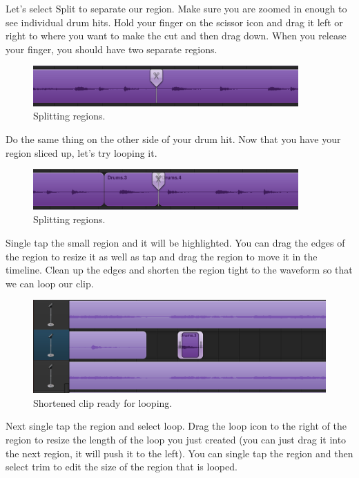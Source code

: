 \documentclass[12pt]{article}
\begin{document}
Let's select Split to separate our region. Make sure you are zoomed in enough to see individual drum hits. Hold your finger on the scissor icon and drag it left or right to where you want to make the cut and then drag down. When you release your finger, you should have two separate regions.
\begin{figure}[h!]
   \centering
   \includegraphics[width=4in]{fig/step2.png}
   \caption*{Splitting regions. \label{fig:slice}}
\end{figure}
Do the same thing on the other side of your drum hit. Now that you have your region sliced up, let's try looping it. 
\begin{figure}[h!]
   \centering
   \includegraphics[width=4in]{fig/step3.png}
   \caption*{Splitting regions. \label{fig:slice}}
\end{figure}

Single tap the small region and it will be highlighted. You can drag the edges of the region to resize it as well as tap and drag the region to move it in the timeline. Clean up the edges and shorten the region tight to the waveform so that we can loop our clip.
\begin{figure}[h]
   \centering
   \includegraphics[width=5in]{fig/step4.png}
   \caption*{Shortened clip ready for looping.}
\end{figure}

Next single tap the region and select loop. Drag the loop icon to the right of the region to resize the length of the loop you just created (you can just drag it into the next region, it will push it to the left). You can single tap the region and then select trim to edit the size of the region that is looped. 
\end{document}
